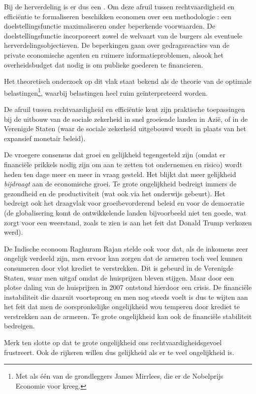 \par Bij de herverdeling is er dus een . Om deze afruil tussen rechtvaardigheid en effici\"entie te formaliseren beschikken economen over een methodologie : een doelstellingsfunctie maximaliseren onder beperkende voorwaarden. De doelstellingsfunctie incorporeert zowel de welvaart van de burgers als eventuele herverdelingsobjectieven.  De beperkingen gaan over gedragsreacties van de private economische agenten en ruimere informatieproblemen, alsook het overheidsbudget dat nodig is om publieke goederen te financieren.
\par Het theoretisch onderzoek op dit vlak staat bekend als de theorie van de optimale belastingen\footnote{Met als \'e\'en van de grondleggers James Mirrlees, die er de Nobelprijs Economie voor kreeg.}, waarbij belastingen heel ruim ge\"interpreteerd worden.\\

\par De afruil tussen rechtvaardigheid en effici\"entie kent zijn praktische toepassingen bij de uitbouw van de sociale zekerheid in snel groeiende landen in Azi\"e, of in de Verenigde Staten (waar de sociale zekerheid uitgebouwd wordt in plaats van het expansief monetair beleid).
\par De vroegere consensus dat groei en gelijkheid tegengesteld zijn (omdat er financi\"ele prikkels nodig zijn om aan te zetten tot ondernemen en risico) wordt heden ten dage meer en meer in vraag gesteld. Het blijkt dat meer gelijkheid \textit{bijdraagt} aan de economische groei. Te grote ongelijkheid bedreigt immers de gezondheid en de productiviteit (wat ook via het onderwijs gebeurt). Het bedreigt ook het draagvlak voor groeibevorderend beleid en voor de democratie (de globalisering komt de ontwikkelende landen bijvoorbeeld niet ten goede, wat zorgt voor een weerstand, zoals te zien is aan het feit dat Donald Trump verkozen werd). 
\par De Indische econoom Raghuram Rajan stelde ook voor dat, als de inkomens zeer ongelijk verdeeld zijn, men ervoor kan zorgen dat de armeren toch veel kunnen consumeren door vlot krediet te verstrekken. Dit is gebeurd in de Verenigde Staten, waar men  uitgaf omdat de huisprijzen bleven stijgen. Maar door een plotse daling van de huisprijzen in 2007 ontstond hierdoor een crisis. De financi\"ele instabiliteit die daaruit voortsprong en men nog steeds voelt is dus te wijten aan het feit dat men de oorspronkelijke ongelijkheid wou temperen door krediet te verstrekken aan de armeren. Te grote ongelijkheid kan ook de financi\"ele stabiliteit bedreigen.\\

\par Merk ten slotte op dat te grote ongelijkheid ons rechtvaardigheidsgevoel frustreert. Ook de rijkeren willen dus gelijkheid als er te veel ongelijkheid is.